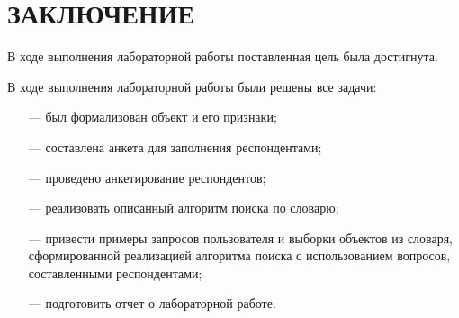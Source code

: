 \section*{ЗАКЛЮЧЕНИЕ}

В ходе выполнения лабораторной работы поставленная цель была достигнута.

В ходе выполнения лабораторной работы были решены все задачи:
\begin{itemize}
	\item[---] был формализован объект и его признаки;
	\item[---] составлена анкета для заполнения респондентами;
	\item[---] проведено анкетирование респондентов;
	\item[---] реализовать описанный алгоритм поиска по словарю;
	\item[---] привести примеры запросов пользователя и выборки объектов из словаря, сформированной реализацией алгоритма поиска с использованием вопросов, составленными респондентами;
	\item[---] подготовить отчет о лабораторной работе.
\end{itemize}